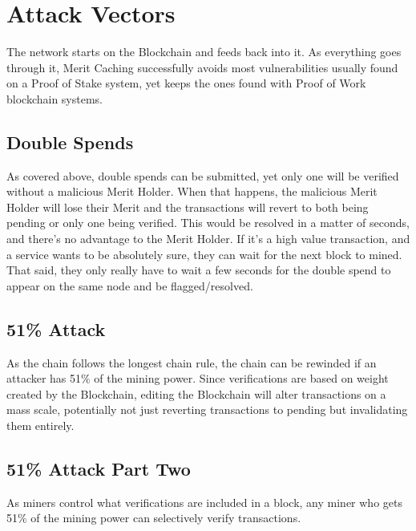 \documentclass[14pt]{article}
\begin{document}
\newpage

\label{sec:3}
\section{Attack Vectors}
The network starts on the Blockchain and feeds back into it. As everything goes through it, Merit Caching successfully avoids most vulnerabilities usually found on a Proof of Stake system, yet keeps the ones found with Proof of Work blockchain systems.

\label{sec:3.1}
\subsection{Double Spends}
As covered above, double spends can be submitted, yet only one will be verified without a malicious Merit Holder. When that happens, the malicious Merit Holder will lose their Merit and the transactions will revert to both being pending or only one being verified. This would be resolved in a matter of seconds, and there's no advantage to the Merit Holder. If it's a high value transaction, and a service wants to be absolutely sure, they can wait for the next block to mined. That said, they only really have to wait a few seconds for the double spend to appear on the same node and be flagged/resolved.

\label{sec:3.2}
\subsection{51\% Attack}
As the chain follows the longest chain rule, the chain can be rewinded if an attacker has 51\% of the mining power. Since verifications are based on weight created by the Blockchain, editing the Blockchain will alter transactions on a mass scale, potentially not just reverting transactions to pending but invalidating them entirely.

\label{sec:3.3}
\subsection{51\% Attack Part Two}
As miners control what verifications are included in a block, any miner who gets 51\% of the mining power can selectively verify transactions.
\end{document}
